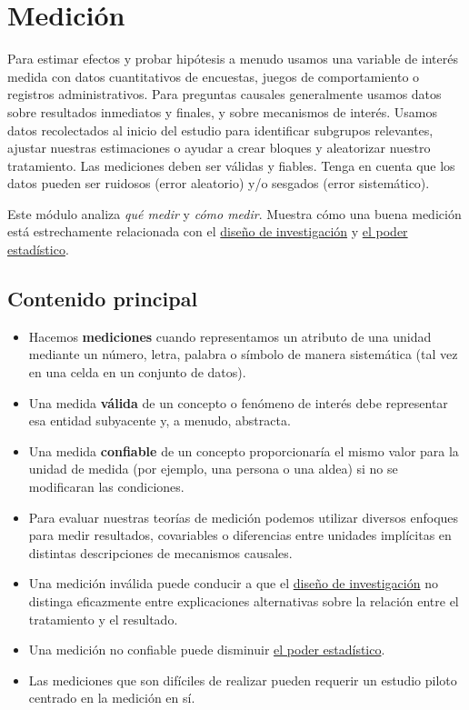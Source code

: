 \documentclass[
  12pt,
  spanish,
]{book}
\begin{document}
\hypertarget{mediciuxf3n}{%
\chapter{Medición}\label{mediciuxf3n}}

Para estimar efectos y probar hipótesis a menudo usamos una variable de interés medida con datos cuantitativos de encuestas, juegos de comportamiento o registros administrativos. Para preguntas causales generalmente usamos datos sobre resultados inmediatos y finales, y sobre mecanismos de interés. Usamos datos recolectados al inicio del estudio para identificar subgrupos relevantes, ajustar nuestras estimaciones o ayudar a crear bloques y aleatorizar nuestro tratamiento. Las mediciones deben ser válidas y fiables. Tenga en cuenta que los datos pueden ser ruidosos (error aleatorio) y/o sesgados (error sistemático).

Este módulo analiza \emph{qué medir} y \emph{cómo medir}. Muestra cómo una buena medición está estrechamente relacionada con el \href{https://egap.github.io/learningdays-resources/Exercises/design-form.Rmd}{diseño de investigación} y \href{poder-estadístico-y-diagnosticandos-del-diseño.html}{el poder estadístico}.

\hypertarget{contenido-principal-6}{%
\section{Contenido principal}\label{contenido-principal-6}}

\begin{itemize}
\item
  Hacemos \textbf{mediciones} cuando representamos un atributo de una unidad mediante un número, letra, palabra o símbolo de manera sistemática (tal vez en una celda en un conjunto de datos).
\item
  Una medida \textbf{válida} de un concepto o fenómeno de interés debe representar esa entidad subyacente y, a menudo, abstracta.
\item
  Una medida \textbf{confiable} de un concepto proporcionaría el mismo valor para la unidad de medida (por ejemplo, una persona o una aldea) si no se modificaran las condiciones.
\item
  Para evaluar nuestras teorías de medición podemos utilizar diversos enfoques para medir resultados, covariables o diferencias entre unidades implícitas en distintas descripciones de mecanismos causales.
\item
  Una medición inválida puede conducir a que el \href{https://egap.github.io/learningdays-resources/Exercises/design-form.Rmd}{diseño de investigación} no distinga eficazmente entre explicaciones alternativas sobre la relación entre el tratamiento y el resultado.
\item
  Una medición no confiable puede disminuir \href{statistical-power-and-design\%20-diagnosands.html}{el poder estadístico}.
\item
  Las mediciones que son difíciles de realizar pueden requerir un estudio piloto centrado en la medición en sí.
\end{itemize}
\end{document}
